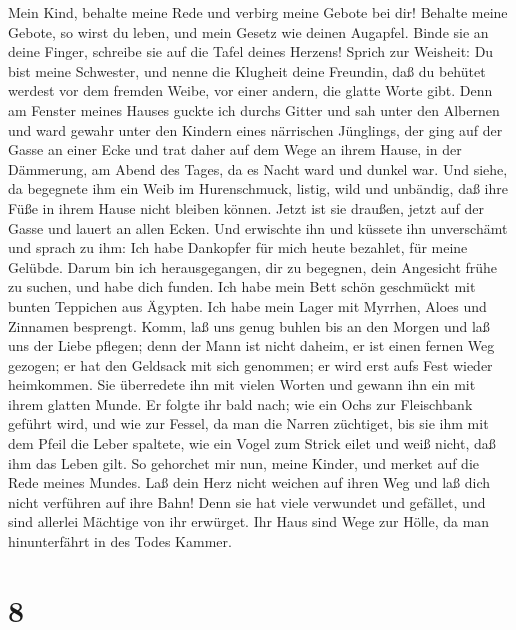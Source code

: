  Mein Kind, behalte meine Rede und verbirg meine Gebote bei
dir!  Behalte meine Gebote, so wirst du leben, und mein
Gesetz wie deinen Augapfel.  Binde sie an deine Finger,
schreibe sie auf die Tafel deines Herzens!  Sprich zur
Weisheit: Du bist meine Schwester, und nenne die Klugheit deine
Freundin,  daß du behütet werdest vor dem fremden Weibe, vor
einer andern, die glatte Worte gibt.  Denn am Fenster meines
Hauses guckte ich durchs Gitter und sah unter den Albernen 
und ward gewahr unter den Kindern eines närrischen Jünglings,
 der ging auf der Gasse an einer Ecke und trat daher auf dem
Wege an ihrem Hause,  in der Dämmerung, am Abend des Tages,
da es Nacht ward und dunkel war.  Und siehe, da begegnete
ihm ein Weib im Hurenschmuck, listig,  wild und unbändig,
daß ihre Füße in ihrem Hause nicht bleiben können.  Jetzt
ist sie draußen, jetzt auf der Gasse und lauert an allen Ecken.
 Und erwischte ihn und küssete ihn unverschämt und sprach
zu ihm:  Ich habe Dankopfer für mich heute bezahlet, für
meine Gelübde.  Darum bin ich herausgegangen, dir zu
begegnen, dein Angesicht frühe zu suchen, und habe dich funden.
 Ich habe mein Bett schön geschmückt mit bunten Teppichen
aus Ägypten.  Ich habe mein Lager mit Myrrhen, Aloes und
Zinnamen besprengt.  Komm, laß uns genug buhlen bis an den
Morgen und laß uns der Liebe pflegen;  denn der Mann ist
nicht daheim, er ist einen fernen Weg gezogen;  er hat den
Geldsack mit sich genommen; er wird erst aufs Fest wieder heimkommen.
 Sie überredete ihn mit vielen Worten und gewann ihn ein
mit ihrem glatten Munde.  Er folgte ihr bald nach; wie ein
Ochs zur Fleischbank geführt wird, und wie zur Fessel, da man die Narren
züchtiget,  bis sie ihm mit dem Pfeil die Leber spaltete,
wie ein Vogel zum Strick eilet und weiß nicht, daß ihm das Leben gilt.
 So gehorchet mir nun, meine Kinder, und merket auf die
Rede meines Mundes.  Laß dein Herz nicht weichen auf ihren
Weg und laß dich nicht verführen auf ihre Bahn!  Denn sie
hat viele verwundet und gefället, und sind allerlei Mächtige von ihr
erwürget.  Ihr Haus sind Wege zur Hölle, da man
hinunterfährt in des Todes Kammer.

\hypertarget{section-7}{%
\section{8}\label{section-7}}

